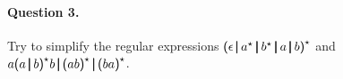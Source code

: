 \paragraph{Question 3.}

Try to simplify the regular expressions
\(\textsf{(} \epsilon \, \pmb{\lvert}{} \, a^{\star}{} \, \pmb{\lvert}{} \,
  b^{\star}{} \, \pmb{\lvert}{} \, a \, \pmb{\lvert}{} \, b \textsf{)}^{\star}\) and
\(a \textsf{(} a \, \pmb{\lvert}{} \, b \textsf{)}^{\star}{} b 
  \, \pmb{\lvert}{} \, \textsf{(} a b \textsf{)}^{\star}{} \, \pmb{\lvert}{} \, \textsf{(}
  b a \textsf{)}^{\star}\).
